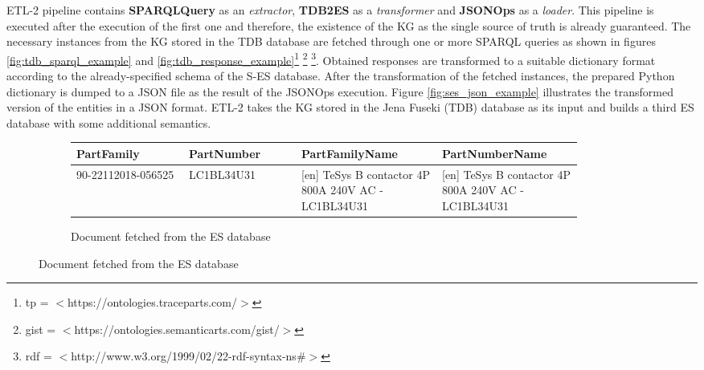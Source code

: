 ETL-2 pipeline contains \textbf{SPARQLQuery} as an \textit{extractor}, \textbf{TDB2ES} as a 
\textit{transformer} and \textbf{JSONOps} as a \textit{loader}. This pipeline is executed after the 
execution of the first one and therefore, the existence of the KG as the single source of truth is 
already 
guaranteed. The necessary instances from the KG stored in the TDB database are fetched through one or 
more SPARQL queries as shown in figures \ref{fig:tdb_sparql_example} and 
\ref{fig:tdb_response_example}\footnote{tp = $<$https://ontologies.traceparts.com/$>$} 
\footnote{gist = $<$https://ontologies.semanticarts.com/gist/$>$} 
\footnote{rdf = $<$http://www.w3.org/1999/02/22-rdf-syntax-ns\#$>$}. Obtained responses are 
transformed to a suitable dictionary format according to the already-specified schema of the 
S-ES database. After the transformation of the fetched instances, the prepared Python dictionary 
is dumped to a JSON file as the result of the JSONOps execution. 
Figure \ref{fig:ses_json_example} illustrates the transformed version of the entities in a JSON format.
ETL-2 takes the KG stored in the Jena Fuseki (TDB) database as its input and builds a third ES 
database with some additional semantics.

\begin{figure}[H]
\centering
\begin{subfigure}{\linewidth}
	\centering

	\begin{table}[H]
		\begin{tabular}{|p{0.20\linewidth}|p{0.20\linewidth}|p{0.25\linewidth}|p{0.25\linewidth}|}
			\hline
			\textbf{PartFamily} & \textbf{PartNumber} & \textbf{PartFamilyName} & \textbf{PartNumberName} \\
			\hline
			90-22112018-056525 & LC1BL34U31 & [en] TeSys B contactor 4P 800A 240V AC - LC1BL34U31 & [en] TeSys B contactor 4P 800A 240V AC - LC1BL34U31 \\
			\hline
		\end{tabular}
	\end{table}

	\caption{Document fetched from the ES database}
	\label{fig:es_doc_example}
\end{subfigure}
\end{figure}


